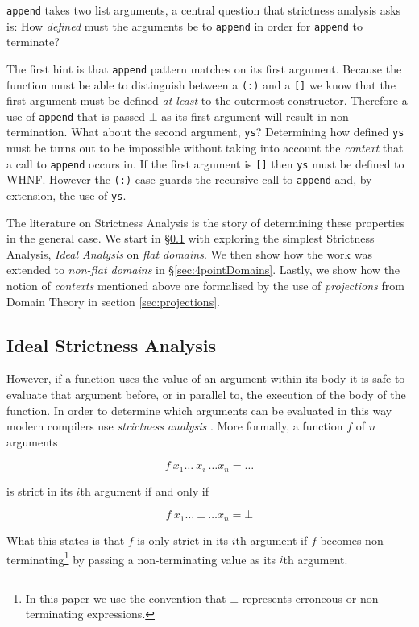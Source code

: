 \verb|append| takes two list arguments, a central question that strictness
analysis asks is: How \emph{defined} must the arguments be to \verb|append|
in order for \verb|append| to terminate?

The first hint is that \verb|append| pattern matches on its first argument.
Because the function must be able to distinguish between a \verb|(:)| and a
\verb|[]| we know that the first argument must be defined \emph{at least} to
the outermost constructor. Therefore a use of \verb|append| that is passed
$\bot$ as its first argument will result in non-termination. What about the
second argument, \verb|ys|? Determining how defined \verb|ys| must be turns
out to be impossible without taking into account the \emph{context} that
a call to \verb|append| occurs in. If the first argument is \verb|[]|
then \verb|ys| must be defined to WHNF. However the \verb|(:)| case
guards the recursive call to \verb|append| and, by extension, the use
of \verb|ys|.

The literature on Strictness Analysis is the story of determining these
properties in the general case. We start in \S \ref{sec:idealAnalysis} with
exploring the simplest Strictness Analysis, \emph{Ideal Analysis} on \emph{flat
domains}. We then show how the work was extended to \emph{non-flat domains} in
\S \ref{sec:4pointDomains}. Lastly, we show how the notion of \emph{contexts}
mentioned above are formalised by the use of \emph{projections} from Domain
Theory in section \ref{sec:projections}.


\subsection{Ideal Strictness Analysis}
\label{sec:idealAnalysis}

However, if a function uses the value of an argument within its body it is safe
to evaluate that argument before, or in parallel to, the execution of the body
of the function. In order to determine which arguments can be evaluated in this
way modern compilers use \emph{strictness analysis} \citep{mycroft1980theory}.
More formally, a function $f$ of $n$ arguments

$$
    f\ x_{1} \dots \ x_{i} \ \dots x_{n} = \dots
$$

\noindent is strict in its $i$th argument if and only if

$$
    f\ x_{1} \dots \ \bot \ \dots x_{n} = \bot
$$

What this states is that $f$ is only strict in its $i$th argument if $f$
becomes non-terminating\footnote{In this paper we use the convention that
$\bot$ represents erroneous or non-terminating expressions.} by passing a
non-terminating value as its $i$th argument.

